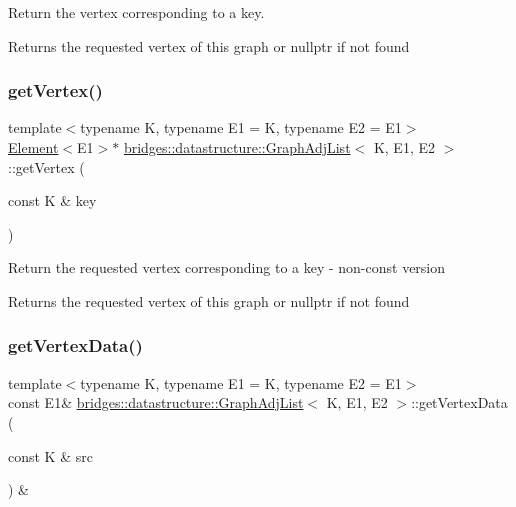 Return the vertex corresponding to a key. 

\begin{DoxyReturn}{Returns}
the requested vertex of this graph or nullptr if not found 
\end{DoxyReturn}
\mbox{\label{classbridges_1_1datastructure_1_1_graph_adj_list_aa55482a035e233299d49874732113e6d}} 
\subsubsection{\texorpdfstring{get\+Vertex()}{getVertex()}\hspace{0.1cm}{\footnotesize\ttfamily [2/2]}}
{\footnotesize\ttfamily template$<$typename K, typename E1 = K, typename E2 = E1$>$ \\
\hyperlink{classbridges_1_1datastructure_1_1_element}{Element}$<$E1$>$$\ast$ \hyperlink{classbridges_1_1datastructure_1_1_graph_adj_list}{bridges\+::datastructure\+::\+Graph\+Adj\+List}$<$ K, E1, E2 $>$\+::get\+Vertex (\begin{DoxyParamCaption}\item[{const K \&}]{key }\end{DoxyParamCaption})\hspace{0.3cm}{\ttfamily [inline]}}

Return the requested vertex corresponding to a key -\/ non-\/const version \begin{DoxyReturn}{Returns}
the requested vertex of this graph or nullptr if not found 
\end{DoxyReturn}
\mbox{\label{classbridges_1_1datastructure_1_1_graph_adj_list_a3a9d3875e7f6eb0d4c3500c53957b9c1}} 
\subsubsection{\texorpdfstring{get\+Vertex\+Data()}{getVertexData()}}
{\footnotesize\ttfamily template$<$typename K, typename E1 = K, typename E2 = E1$>$ \\
const E1\& \hyperlink{classbridges_1_1datastructure_1_1_graph_adj_list}{bridges\+::datastructure\+::\+Graph\+Adj\+List}$<$ K, E1, E2 $>$\+::get\+Vertex\+Data (\begin{DoxyParamCaption}\item[{const K \&}]{src }\end{DoxyParamCaption}) \&\hspace{0.3cm}{\ttfamily [inline]}}



